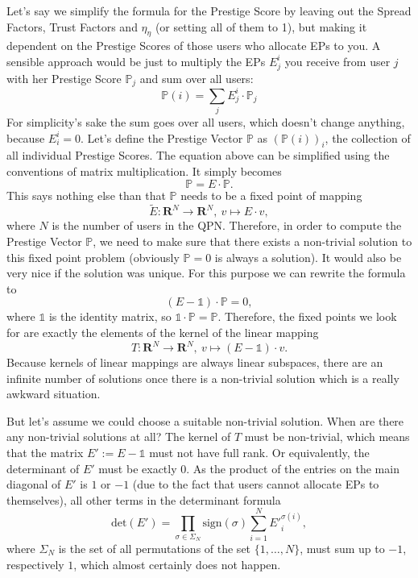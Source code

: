 \documentclass[a4paper,12pt]{scrartcl}
\newcounter{formula}
\begin{document}
Let's say we simplify the formula for the Prestige Score by leaving out the Spread Factors, Trust Factors and $\eta_{\eta}$ (or setting all of them to 1), but making it dependent on the Prestige Scores of those users who allocate EPs to you. A sensible approach would be just to multiply the EPs $E^i_j$ you receive from user $j$ with her Prestige Score $\mathbb{P}_j$ and sum over all users:
$$\mathbb{P}(i) = \sum_{j} E^i_j \cdot \mathbb{P}_j$$
For simplicity's sake the sum goes over all users, which doesn't change anything, because $E^i_i = 0$.
Let's define the Prestige Vector $\mathbb{P}$ as $(\mathbb{P}(i))_i$, the collection of all individual Prestige Scores. The equation above can be simplified using the conventions of matrix multiplication. It simply becomes
$$\mathbb{P} = E \cdot \mathbb{P}.$$
This says nothing else than that $\mathbb{P}$ needs to be a fixed point of mapping
$$\tilde{E}: \mathbf{R}^N \rightarrow \mathbf{R}^N, \: v \mapsto E \cdot v,$$
where $N$ is the number of users in the QPN.
Therefore, in order to compute the Prestige Vector $\mathbb{P}$, we need to make sure that there exists a non-trivial solution to this fixed point problem (obviously $\mathbb{P}=0$ is always a solution). It would also be very nice if the solution was unique.
For this purpose we can rewrite the formula to
$$(E-\mathds{1})\cdot \mathbb{P} = 0,$$
where $\mathds{1}$ is the identity matrix, so $\mathds{1} \cdot \mathbb{P} = \mathbb{P}$. Therefore, the fixed points we look for are exactly the elements of the kernel of the linear mapping
$$T: \mathbf{R}^N \rightarrow \mathbf{R}^N, \: v \mapsto (E-\mathds{1}) \cdot v.$$
Because kernels of linear mappings are always linear subspaces, there are an infinite number of solutions once there is a non-trivial solution which is a really awkward situation.

But let's assume we could choose a suitable non-trivial solution. When are there any non-trivial solutions at all? The kernel of $T$ must be non-trivial, which means that the matrix $E' := E-\mathds{1}$ must not have full rank. Or equivalently, the determinant of $E'$ must be exactly $0$. As the product of the entries on the main diagonal of $E'$ is $1$ or $-1$ (due to the fact that users cannot allocate EPs to themselves), all other terms in the determinant formula
$$\mbox{det}(E') = \prod_{\sigma \in \Sigma_N} \mbox{sign}(\sigma) \sum_{i=1}^{N} E'^{\sigma(i)}_i,$$
where $\Sigma_N$ is the set of all permutations of the set $\{1,\ldots,N\}$, must sum up to $-1$, respectively $1$, which almost certainly does not happen.
\end{document}
